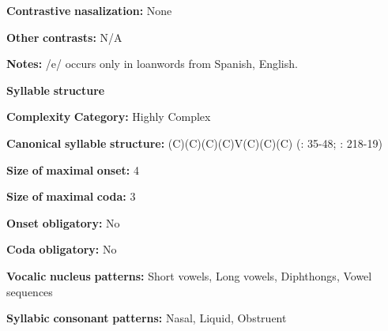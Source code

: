 \documentclass[output=paper]{langsci/langscibook}
\begin{document}
\begin{styleBody}
\textbf{Contrastive} \textbf{nasalization:} None
\end{styleBody}

\begin{styleBody}
\textbf{Other} \textbf{contrasts:} N/A
\end{styleBody}

\begin{styleBody}
\textbf{Notes:} /e/ occurs only in loanwords from Spanish, English.
\end{styleBody}

\begin{styleBody}
\textbf{Syllable} \textbf{structure}
\end{styleBody}

\begin{styleBody}
\textbf{Complexity} \textbf{Category:} Highly Complex
\end{styleBody}

\begin{styleBody}
\textbf{Canonical} \textbf{syllable} \textbf{structure:} (C)(C)(C)(C)V(C)(C)(C) (\citealt{Crawford1966}: 35-48; \citealt{Bendixen1980}: 218-19)
\end{styleBody}

\begin{styleBody}
\textbf{Size} \textbf{of} \textbf{maximal} \textbf{onset:} 4
\end{styleBody}

\begin{styleBody}
\textbf{Size} \textbf{of} \textbf{maximal} \textbf{coda:} 3
\end{styleBody}

\begin{styleBody}
\textbf{Onset} \textbf{obligatory:} No
\end{styleBody}

\begin{styleBody}
\textbf{Coda} \textbf{obligatory:} No
\end{styleBody}

\begin{styleBody}
\textbf{Vocalic} \textbf{nucleus} \textbf{patterns:} Short vowels, Long vowels, Diphthongs, Vowel sequences
\end{styleBody}

\begin{styleBody}
\textbf{Syllabic} \textbf{consonant} \textbf{patterns:} Nasal, Liquid, Obstruent
\end{styleBody}
\end{document}
